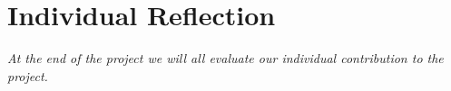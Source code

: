 \section{Individual Reflection}
\textit{At the end of the project we will all evaluate our individual contribution to the project.}





